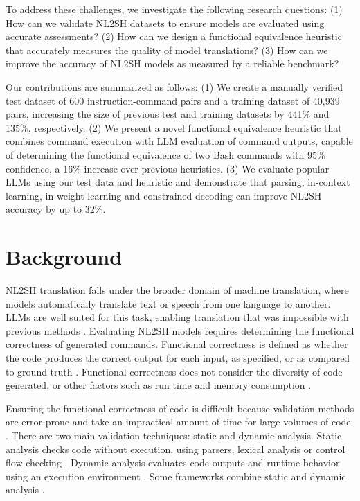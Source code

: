 \documentclass[11pt]{article}
\begin{document}
To address these challenges, we investigate the following research questions: (1) How can we validate NL2SH datasets to ensure models are evaluated using accurate assessments? (2) How can we design a functional equivalence heuristic that accurately measures the quality of model translations? (3) How can we improve the accuracy of NL2SH models as measured by a reliable benchmark?

Our contributions are summarized as follows: (1) We create a manually verified test dataset of 600 instruction-command pairs and a training dataset of 40,939 pairs, increasing the size of previous test and training datasets by 441\% and 135\%, respectively. (2) We present a novel functional equivalence heuristic that combines command execution with LLM evaluation of command outputs, capable of determining the functional equivalence of two Bash commands with 95\% confidence, a 16\% increase over previous heuristics. (3) We evaluate popular LLMs using our test data and heuristic and demonstrate that parsing, in-context learning, in-weight learning and constrained decoding can improve NL2SH accuracy by up to 32\%.


\section{Background}
\label{sec:background}
NL2SH translation falls under the broader domain of machine translation, where models automatically translate text or speech from one language to another. LLMs are well suited for this task, enabling translation that was impossible with previous methods \cite{machinetranslation}. Evaluating NL2SH models requires determining the functional correctness of generated commands. Functional correctness is defined as whether the code produces the correct output for each input, as specified, or as compared to ground truth \cite{codecorrectness}. Functional correctness does not consider the diversity of code generated, or other factors such as run time and memory consumption \cite{funccorrectenough}.

Ensuring the functional correctness of code is difficult because validation methods are error-prone and take an impractical amount of time for large volumes of code \cite{codecorrectness}. There are two main validation techniques: static and dynamic analysis. Static analysis checks code without execution, using parsers, lexical analysis or control flow checking \cite{codepatch}. Dynamic analysis evaluates code outputs and runtime behavior using an execution environment \cite{InterCode}. Some frameworks combine static and dynamic analysis \cite{codesift}.
\end{document}
